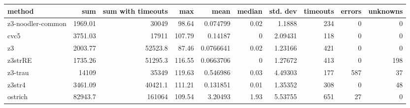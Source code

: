 \begin{tabular}{lrrrrrrrrr}
\hline
 method            &      sum &   sum with timeouts &    max &      mean &   median &   std. dev &   timeouts &   errors &   unknowns \\
\hline
 z3-noodler-common &  1969.01 &             30049   &  98.64 & 0.074799  &     0.02 &    1.1888  &        234 &        0 &          0 \\
 cvc5              &  3751.03 &             17911   & 107.79 & 0.14187   &     0    &    2.09431 &        118 &        0 &          0 \\
 z3                &  2003.77 &             52523.8 &  87.46 & 0.0766641 &     0.02 &    1.23166 &        421 &        0 &          0 \\
 z3strRE           &  1735.26 &             51295.3 & 116.55 & 0.0663706 &     0    &    1.27672 &        413 &        0 &        198 \\
 z3-trau           & 14109    &             35349   & 119.63 & 0.546986  &     0.03 &    4.49303 &        177 &      587 &         37 \\
 z3str4            &  3461.09 &             40421.1 & 111.21 & 0.131851  &     0.01 &    1.35352 &        308 &        0 &         48 \\
 ostrich           & 82943.7  &            161064   & 109.54 & 3.20493   &     1.93 &    5.53755 &        651 &       27 &          0 \\
\hline
\end{tabular}
